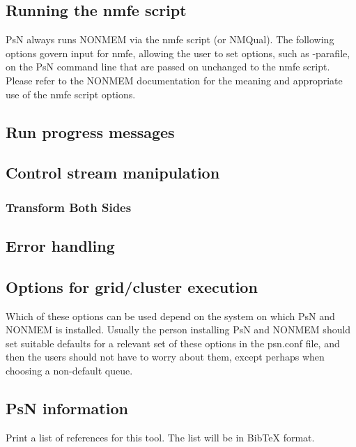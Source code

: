 \subsection{Running the nmfe script}
PsN always runs NONMEM via the nmfe script (or NMQual). The following options govern input for nmfe, allowing the user to set options, such as -parafile, on the PsN command line that are passed on unchanged to the nmfe script. Please refer to the NONMEM documentation for the meaning and appropriate use of the nmfe script options.


\subsection{Run progress messages}


\subsection{Control stream manipulation}

\subsubsection{Transform Both Sides}



\subsection{Error handling}



\subsection{Options for grid/cluster execution}
Which of these options can be used depend on the system on which PsN and NONMEM is installed. Usually the person installing PsN and NONMEM should set suitable defaults for a relevant set of these options in the psn.conf file, and then the users should not have to worry about them, except perhaps when choosing a non-default queue.


\subsection{PsN information}
\begin{optionlist}
Print a list of references for this tool. The list will be in BibTeX format.
\nextopt
\end{optionlist}



